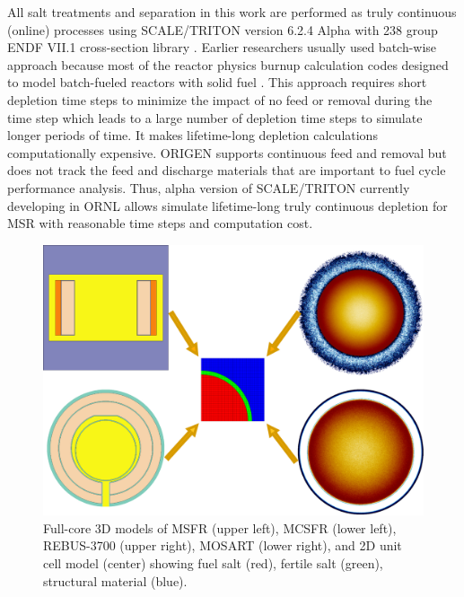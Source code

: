 \documentclass{anstrans}
\begin{document}
All salt treatments and separation in this work are performed as truly continuous (online) processes using SCALE/TRITON version 6.2.4 Alpha with 238 group ENDF VII.1 cross-section library \cite{rearden_scale_2016}.  Earlier researchers usually used batch-wise approach because most of the reactor physics burnup calculation codes designed to model batch-fueled reactors with solid fuel \cite{betzler_molten_2017, rykhlevskii_online_2017}. This approach requires short depletion time steps to minimize the impact of no feed or removal during the time step which leads to a large number of depletion time steps to simulate longer periods of time. It makes lifetime-long depletion calculations computationally expensive. ORIGEN \cite{gauld_isotopic_2011} supports continuous feed and removal but does not track the feed and discharge materials that are important to fuel cycle performance analysis. Thus, alpha version of SCALE/TRITON currently developing in \gls{ORNL} allows simulate lifetime-long truly continuous depletion for \gls{MSR} with reasonable time steps and computation cost.
\begin{figure}[!htb]
  \centering
  \includegraphics[scale=0.265]{./Figures/fsmsrs.pdf}
  \caption{Full-core 3D models of \gls{MSFR} (upper left), \gls{MCSFR} (lower left), REBUS-3700 (upper right), \gls{MOSART} (lower right), and 2D unit cell model (center) showing fuel salt (red), fertile salt (green), structural material (blue).}   
  \label{fig:unit_cell}
\end{figure}
\end{document}
